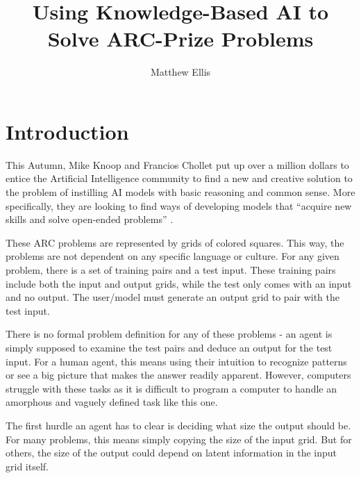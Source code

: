 \documentclass[letterpaper]{article} %
\title{Using Knowledge-Based AI to Solve ARC-Prize Problems}
\author{
    Matthew Ellis
}
\begin{document}
\maketitle


%

\section{Introduction}
This Autumn, Mike Knoop and Francios Chollet put up over a million dollars to entice the Artificial Intelligence community to find a new and creative solution to the problem of instilling AI models with basic reasoning and common sense. More specifically, they are looking to find ways of developing models that ``acquire new skills and solve open-ended problems'' \cite{arcprize}.

These ARC problems are represented by grids of colored squares. This way, the problems are not dependent on any specific language or culture. For any given problem, there is a set of training pairs and a test input. These training pairs include both the input and output grids, while the test only comes with an input and no output. The user/model must generate an output grid to pair with the test input.

There is no formal problem definition for any of these problems - an agent is simply supposed to examine the test pairs and deduce an output for the test input. For a human agent, this means using their intuition to recognize patterns or see a big picture that makes the answer readily apparent. However, computers struggle with these tasks as it is difficult to program a computer to handle an amorphous and vaguely defined task like this one.

The first hurdle an agent has to clear is deciding what size the output should be. For many problems, this means simply copying the size of the input grid. But for others, the size of the output could depend on latent information in the input grid itself.
\end{document}

